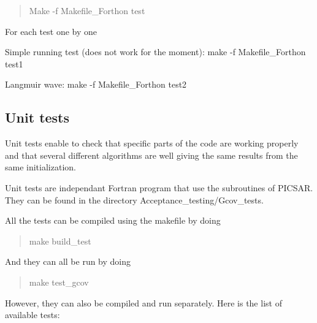 \begin{quote}
Make -\/f Makefile\+\_\+\+Forthon test \end{quote}


For each test one by one
\begin{DoxyItemize}
\item Simple running test (does not work for the moment)\+: {\ttfamily make -\/f Makefile\+\_\+\+Forthon test1}
\item Langmuir wave\+: {\ttfamily make -\/f Makefile\+\_\+\+Forthon test2}
\end{DoxyItemize}

\subsection*{Unit tests  }

Unit tests enable to check that specific parts of the code are working properly and that several different algorithms are well giving the same results from the same initialization.

Unit tests are independant Fortran program that use the subroutines of P\+I\+C\+S\+AR. They can be found in the directory {\ttfamily Acceptance\+\_\+testing/\+Gcov\+\_\+tests}.

All the tests can be compiled using the makefile by doing

\begin{quote}
make build\+\_\+test \end{quote}


And they can all be run by doing

\begin{quote}
make test\+\_\+gcov \end{quote}


However, they can also be compiled and run separately. Here is the list of available tests\+:

